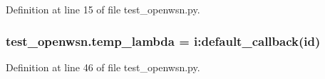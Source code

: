 Definition at line 15 of file test\+\_\+openwsn.\+py.

\subsubsection[{\texorpdfstring{temp\+\_\+lambda}{temp_lambda}}]{\setlength{\rightskip}{0pt plus 5cm}test\+\_\+openwsn.\+temp\+\_\+lambda = i\+:default\+\_\+callback(id)}\hypertarget{namespacetest__openwsn_a109eefda679b7feab04bd321b1bdf241}{}\label{namespacetest__openwsn_a109eefda679b7feab04bd321b1bdf241}


Definition at line 46 of file test\+\_\+openwsn.\+py.

